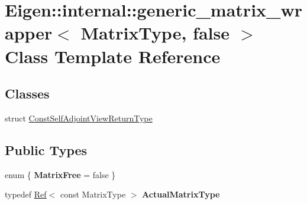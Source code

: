 \hypertarget{class_eigen_1_1internal_1_1generic__matrix__wrapper_3_01_matrix_type_00_01false_01_4}{}\section{Eigen\+::internal\+::generic\+\_\+matrix\+\_\+wrapper$<$ Matrix\+Type, false $>$ Class Template Reference}
\label{class_eigen_1_1internal_1_1generic__matrix__wrapper_3_01_matrix_type_00_01false_01_4}
\subsection*{Classes}
\begin{DoxyCompactItemize}
\item 
struct \mbox{\hyperlink{struct_eigen_1_1internal_1_1generic__matrix__wrapper_3_01_matrix_type_00_01false_01_4_1_1_const_self_adjoint_view_return_type}{Const\+Self\+Adjoint\+View\+Return\+Type}}
\end{DoxyCompactItemize}
\subsection*{Public Types}
\begin{DoxyCompactItemize}
\item 
\mbox{\label{class_eigen_1_1internal_1_1generic__matrix__wrapper_3_01_matrix_type_00_01false_01_4_a14abc4abe12482652dfde98f242e28d0}} 
enum \{ {\bfseries Matrix\+Free} = false
 \}
\item 
\mbox{\label{class_eigen_1_1internal_1_1generic__matrix__wrapper_3_01_matrix_type_00_01false_01_4_a70553e46f5c9ca4752cba6f13823f68f}} 
typedef \mbox{\hyperlink{class_eigen_1_1_ref}{Ref}}$<$ const Matrix\+Type $>$ {\bfseries Actual\+Matrix\+Type}
\end{DoxyCompactItemize}
